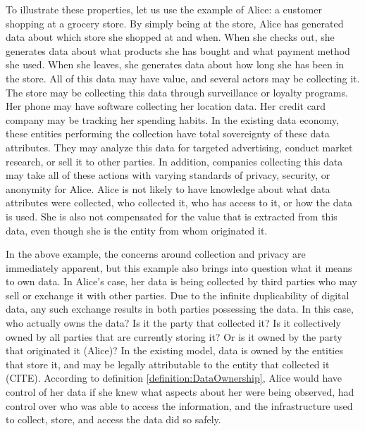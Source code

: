 To illustrate these properties, let us use the example of Alice: a customer shopping at a grocery store. By simply being at the store, Alice has generated data about 
which store she shopped at and when. When she checks out, she generates data about what products she has bought and what payment method she used. When she leaves, 
she generates data about how long she has been in the store. All of this data may have value, and several actors may be collecting it. The store may be collecting 
this data through surveillance or loyalty programs. Her phone may have software collecting her location data. Her credit card company may be tracking her spending 
habits. In the existing data economy, these entities performing the collection have total sovereignty of these data attributes. They may analyze this data for targeted 
advertising, conduct market research, or sell it to other parties. In addition, companies collecting this data may take all of these actions with varying standards 
of privacy, security, or anonymity for Alice. Alice is not likely to have knowledge about what data attributes were collected, who collected it, who has access to it, or how 
the data is used. She is also not compensated for the value that is extracted from this data, even though she is the entity from whom originated it.

In the above example, the concerns around collection and privacy are immediately apparent, but this example also brings into question what it means to own data. 
In Alice's case, her data is being collected by third parties who may sell or exchange it with other parties. Due to the infinite duplicability of digital data, any 
such exchange results in both parties possessing the data. In this case, who actually owns the data? Is it the party that collected it? Is it collectively owned by 
all parties that are currently storing it? Or is it owned by the party that originated it (Alice)? In the existing model, data is owned by the entities that store it, 
and may be legally attributable to the entity that collected it (CITE). According to definition \ref{definition:DataOwnership}, Alice would have control of her data 
if she knew what aspects about her were being observed, had control over who was able to access the information, and the infrastructure used to collect, store, and 
access the data did so safely.

%

